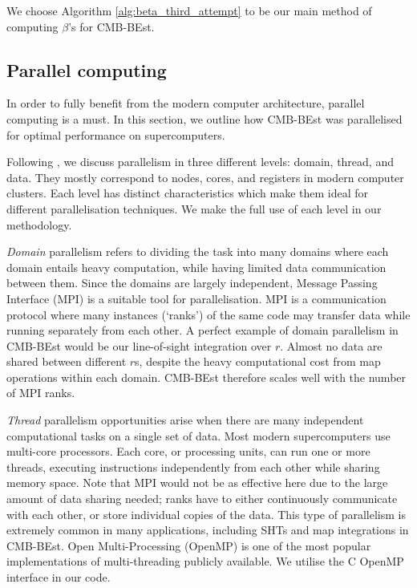 We choose Algorithm \ref{alg:beta_third_attempt} to be our main method of computing $\beta$'s for CMB-BEst.

\subsection{Parallel computing}


In order to fully benefit from the modern computer architecture, parallel computing is a must. In this section, we outline how CMB-BEst was parallelised for optimal performance on supercomputers.

Following \cite{Jeffers2016intel}, we discuss parallelism in three different levels: domain, thread, and data. They mostly correspond to nodes, cores, and registers in modern computer clusters. Each level has distinct characteristics which make them ideal for different parallelisation techniques. We make the full use of each level in our methodology.

\textit{Domain} parallelism refers to dividing the task into many domains where each domain entails heavy computation, while having limited data communication between them. Since the domains are largely independent, Message Passing Interface (MPI) is a suitable tool for parallelisation. MPI is a communication protocol where many instances (`ranks') of the same code may transfer data while running separately from each other. A perfect example of domain parallelism in CMB-BEst would be our line-of-sight integration over $r$. Almost no data are shared between different $r$s, despite the heavy computational cost from map operations within each domain. CMB-BEst therefore scales well with the number of MPI ranks.

\textit{Thread} parallelism opportunities arise when there are many independent computational tasks on a single set of data. Most modern supercomputers use multi-core processors. Each core, or processing units, can run one or more threads, executing instructions independently from each other while sharing memory space. Note that MPI would not be as effective here due to the large amount of data sharing needed; ranks have to either continuously communicate with each other, or store individual copies of the data. This type of parallelism is extremely common in many applications, including SHTs and map integrations in CMB-BEst. Open Multi-Processing (OpenMP) is one of the most popular implementations of multi-threading publicly available. We utilise the \textsc{C} OpenMP interface in our code. 

